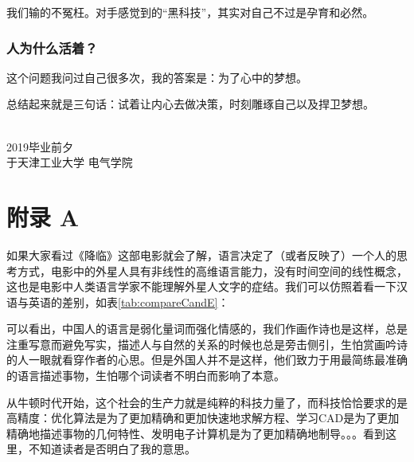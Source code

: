 \documentclass[UTF8]{ctexbook}
\begin{document}
我们输的不冤枉。对手感觉到的“黑科技”，其实对自己不过是孕育和必然。

\subsection*{人为什么活着？}
这个问题我问过自己很多次，我的答案是：为了心中的梦想。

\vspace{2cm}
总结起来就是三句话：试着让内心去做决策，时刻雕琢自己以及捍卫梦想。

\hspace{4cm}\\
\noindent2019毕业前夕\\
于天津工业大学 \quad 电气学院


\chapter*{附录 A}\label{fuluA}
	  如果大家看过《降临》这部电影就会了解，语言决定了（或者反映了）一个人的思考方式，电影中的外星人具有非线性的高维语言能力，没有时间空间的线性概念，这也是电影中人类语言学家不能理解外星人文字的症结。我们可以仿照着看一下汉语与英语的差别，如表\ref{tab:compareCandE}：

	  \begin{table}[!htb]
		  \renewcommand{\arraystretch}{1.3} %
		  \caption{中英对比}\label{tab:compareCandE}
		  \centering
		  \vspace{0.2cm}
	  \end{table}
	  
	  可以看出，中国人的语言是弱化量词而强化情感的，我们作画作诗也是这样，总是注重写意而避免写实，描述人与自然的关系的时候也总是旁击侧引，生怕赏画吟诗的人一眼就看穿作者的心思。但是外国人并不是这样，他们致力于用最简练最准确的语言描述事物，生怕哪个词读者不明白而影响了本意。
	  
	  从牛顿时代开始，这个社会的生产力就是纯粹的科技力量了，而科技恰恰要求的是高精度：优化算法是为了更加精确和更加快速地求解方程、学习CAD是为了更加精确地描述事物的几何特性、发明电子计算机是为了更加精确地制导。。。看到这里，不知道读者是否明白了我的意思。
\end{document}
